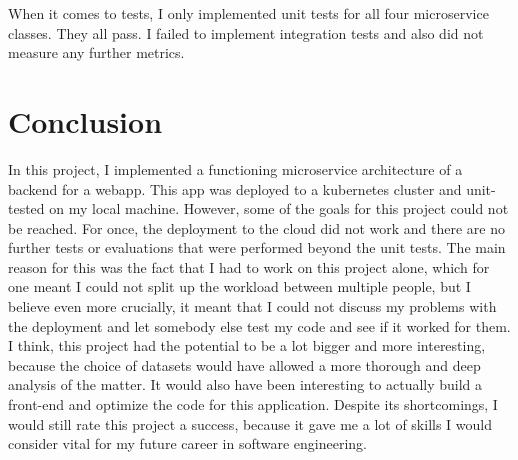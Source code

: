 \documentclass[11pt]{article}
\begin{document}
	When it comes to tests, I only implemented unit tests for all four microservice classes. They all pass. I failed to implement integration tests and also did not measure any further metrics.
	
	\section{Conclusion}
	
	In this project, I implemented a functioning microservice architecture of a backend for a webapp. This app was deployed to a kubernetes cluster and unit-tested on my local machine. However, some of the goals for this project could not be reached. For once, the deployment to the cloud did not work and there are no further tests or evaluations that were performed beyond the unit tests. The main reason for this was the fact that I had to work on this project alone, which for one meant I could not split up the workload between multiple people, but I believe even more crucially, it meant that I could not discuss my problems with the deployment and let somebody else test my code and see if it worked for them. I think, this project had the potential to be a lot bigger and more interesting, because the choice of datasets would have allowed a more thorough and deep analysis of the matter. It would also have been interesting to actually build a front-end and optimize the code for this application. Despite its shortcomings, I would still rate this project a success, because it gave me a lot of skills I would consider vital for my future career in software engineering.
	
	\newpage
	
	
	
	
	
\end{document}
